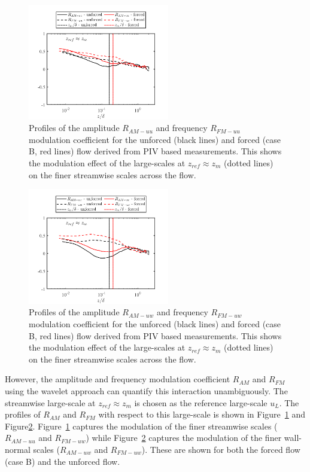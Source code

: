 \begin{figure}[h]
	\centering
	\includegraphics[width=0.55\textwidth]{pics/afosrAMFMuuzMax.png}
	\caption{Profiles of the amplitude $R_{AM-uu}$ and frequency $R_{FM-uu}$ modulation coefficient for the unforced (black lines) and forced (case B, red lines) flow derived from PIV based measurements. This shows the modulation effect of the large-scales at $z_{ref}\approx z_m$ (dotted lines) on the finer streamwise scales across the flow.}
	\label{fig:AMFMuuzMax}      
\end{figure}

\begin{figure}[h]
	\centering
	\includegraphics[width=0.55\textwidth]{pics/afosrAMFMuwzMax.png}
	\caption{Profiles of the amplitude $R_{AM-uw}$ and frequency $R_{FM-uw}$ modulation coefficient for the unforced (black lines) and forced (case B, red lines) flow derived from PIV based measurements. This shows the modulation effect of the large-scales at $z_{ref}\approx z_m$ (dotted lines) on the finer streamwise scales across the flow.}
	\label{fig:AMFMuwzMax}       
\end{figure}

However, the amplitude and frequency modulation coefficient $R_{AM}$ and $R_{FM}$ using the wavelet approach can quantify this interaction unambiguously. The streamwise large-scale at $z_{ref}\approx z_m$ is chosen as the reference large-scale $u_L$. The profiles of $R_{AM}$ and $R_{FM}$ with respect to this large-scale is shown in Figure~\ref{fig:AMFMuuzMax} and Figure\ref{fig:AMFMuwzMax}. Figure~\ref{fig:AMFMuuzMax} captures the modulation of the finer streamwise scales ($R_{AM-uu}$ and $R_{FM-uw}$) while Figure~\ref{fig:AMFMuwzMax} captures the modulation of the finer wall-normal scales ($R_{AM-uw}$ and $R_{FM-uw}$). These are shown for both the forced flow (case B) and the unforced flow. 

